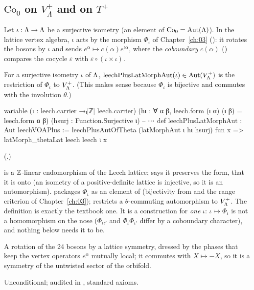 \subsection{\texorpdfstring{$\mathrm{Co}_0$}{Co0} on \texorpdfstring{$V_\Lambda^+$}{V\_Lambda+} and on \texorpdfstring{$T^+$}{T+}}

Let $\iota:{\Lambda}\to{\Lambda}$ be a surjective isometry (an element of $\mathrm{Co}_0=\operatorname{Aut}({\Lambda})$).  In the lattice
vertex algebra, $\iota$ acts by the morphism $\Phi_\iota$ of Chapter~\ref{ch:03} (): it rotates the
bosons by $\iota$ and sends $e^\alpha\mapsto c(\alpha)e^{\iota\alpha}$, where the \emph{coboundary}
$c(\alpha)$ () compares the cocycle $\varepsilon$ with $\varepsilon\circ(\iota\times\iota)$.

\begin{definition}\label{ch22:def:latplus}
For a surjective isometry $\iota$ of ${\Lambda}$, $\mathrm{leechPlusLatMorphAut}(\iota)\in\operatorname{Aut}(V_{\Lambda}^+)$ is the restriction of
$\Phi_\iota$ to $V_{\Lambda}^+$.  (This makes sense because $\Phi_\iota$ is bijective and commutes with the involution
$\theta$.)
\end{definition}
\begin{leancode}
variable (ι : leech.carrier →ₗ[ℤ] leech.carrier)
  (hι : ∀ α β, leech.form (ι α) (ι β) = leech.form α β) (hsurj : Function.Surjective ι)
-- ⋯
def leechPlusLatMorphAut : Aut leechVOAPlus :=
  leechPlusAutOfTheta (latMorphAut ι hι hsurj) fun x => latMorph_thetaLat leech leech ι x
\end{leancode}
(.)
\begin{dictionary}
 is a ${\mathbb{Z}}$-linear endomorphism of the Leech lattice;  says it
preserves the form,  that it is onto (an isometry of a positive-definite lattice is injective, so it is an
automorphism).   packages $\Phi_\iota$ as an element of  (bijectivity from
 and the range criterion  of Chapter~\ref{ch:03});
 restricts a $\theta$-commuting automorphism to $V_{\Lambda}^+$.  The definition is exactly the
textbook one.  It is a construction for \emph{one} $\iota$: $\iota\mapsto\Phi_\iota$ is not a homomorphism on the nose
($\Phi_{\iota\iota'}$ and $\Phi_\iota\Phi_{\iota'}$ differ by a coboundary character), and nothing below needs it to
be.
\end{dictionary}
\begin{physics}
A rotation of the 24 bosons by a lattice symmetry, dressed by the phases that keep the vertex operators $e^\alpha$
mutually local; it commutes with $X\mapsto-X$, so it is a symmetry of the untwisted sector of the orbifold.
\end{physics}
\begin{status}Unconditional; audited in , standard axioms.\end{status}

